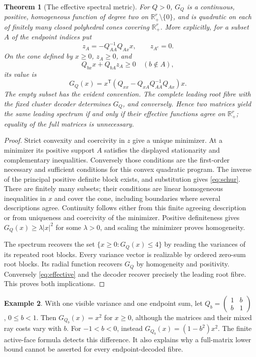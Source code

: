 \documentclass[11pt,reqno]{amsart}
\numberwithin{equation}{section}
\newtheorem{theorem}{Theorem}[section]
\theoremstyle{definition}
\newtheorem{example}[theorem]{Example}
\theoremstyle{remark}
\newcommand{\R}{\mathbb R}
\begin{document}
\begin{theorem}[The effective spectral metric]\label{thm:endpoints}
For $Q>0$, $G_Q$ is a continuous, positive, homogeneous function of degree two on $\R_+^r\setminus\{0\}$, and is quadratic on each of finitely many closed polyhedral cones covering $\R_+^r$. More explicitly, for a subset $A$ of the endpoint indices put
\[
 z_A=-Q_{AA}^{-1}Q_{Ax}x,\qquad z_{A^c}=0.
\]
On the cone defined by $x\ge0$, $z_A\ge0$, and
\[
 Q_{bx}x+Q_{bA}z_A\ge0\quad(b\notin A),
\]
its value is
\begin{equation}\label{eq:schur}
 G_Q(x)=x^{\mathsf T}
       (Q_{xx}-Q_{xA}Q_{AA}^{-1}Q_{Ax})x.
\end{equation}
The empty subset has the evident convention. The complete leading root fibre with the fixed cluster decoder determines $G_Q$, and conversely. Hence two matrices yield the same leading spectrum if and only if their effective functions agree on $\R_+^r$; equality of the full matrices is unnecessary.
\end{theorem}
\begin{proof}
Strict convexity and coercivity in $z$ give a unique minimizer. At a minimizer its positive support $A$ satisfies the displayed stationarity and complementary inequalities. Conversely those conditions are the first-order necessary and sufficient conditions for this convex quadratic program. The inverse of the principal positive definite block exists, and substitution gives \eqref{eq:schur}. There are finitely many subsets; their conditions are linear homogeneous inequalities in $x$ and cover the cone, including boundaries where several descriptions agree. Continuity follows either from this finite agreeing description or from uniqueness and coercivity of the minimizer. Positive definiteness gives $G_Q(x)\ge\lambda|x|^2$ for some $\lambda>0$, and scaling the minimizer proves homogeneity.

The spectrum recovers the set $\{x\ge0:G_Q(x)\le4\}$ by reading the variances of its repeated root blocks. Every variance vector is realizable by ordered zero-sum root blocks. Its radial function recovers $G_Q$ by homogeneity and positivity. Conversely \eqref{eq:effective} and the decoder recover precisely the leading root fibre. This proves both implications.
\end{proof}

\begin{example}\label{ex:invisible}
With one visible variance and one endpoint sum, let
$Q_b=\left(\begin{smallmatrix}1&b\\b&1\end{smallmatrix}\right)$, $0\le b<1$.
Then $G_{Q_b}(x)=x^2$ for $x\ge0$, although the matrices and their mixed ray costs vary with $b$. For $-1<b<0$, instead $G_{Q_b}(x)=(1-b^2)x^2$. The finite active-face formula detects this difference. It also explains why a full-matrix lower bound cannot be asserted for every endpoint-decoded fibre.
\end{example}
\end{document}
